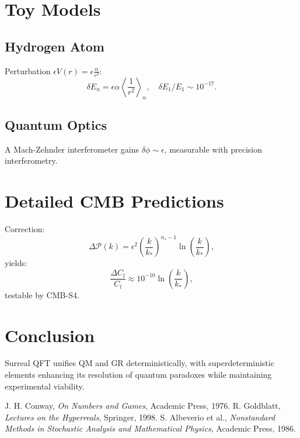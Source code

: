 \documentclass{article}
\begin{document}
\section{Toy Models}
\subsection{Hydrogen Atom}
Perturbation \(\epsilon V(r) = \epsilon \frac{\alpha}{r^2}\):
\begin{equation}
\delta E_n = \epsilon \alpha \left\langle \frac{1}{r^2} \right\rangle_n, \quad \delta E_1 / E_1 \sim 10^{-17}.
\end{equation}

\subsection{Quantum Optics}
A Mach-Zehnder interferometer gains \(\delta \phi \sim \epsilon\), measurable with precision interferometry.

\section{Detailed CMB Predictions}
Correction:
\begin{equation}
\Delta \mathcal{P}(k) = \epsilon^2 \left( \frac{k}{k_*} \right)^{n_s-1} \ln \left( \frac{k}{k_*} \right),
\end{equation}
yields:
\begin{equation}
\frac{\Delta C_l}{C_l} \approx 10^{-10} \ln \left( \frac{k}{k_*} \right),
\end{equation}
testable by CMB-S4.

\section{Conclusion}
Surreal QFT unifies QM and GR deterministically, with superdeterministic elements enhancing its resolution of quantum paradoxes while maintaining experimental viability.

\begin{thebibliography}{9}
 J. H. Conway, \emph{On Numbers and Games}, Academic Press, 1976.
 R. Goldblatt, \emph{Lectures on the Hyperreals}, Springer, 1998.
 S. Albeverio et al., \emph{Nonstandard Methods in Stochastic Analysis and Mathematical Physics}, Academic Press, 1986.
\end{thebibliography}
\end{document}
